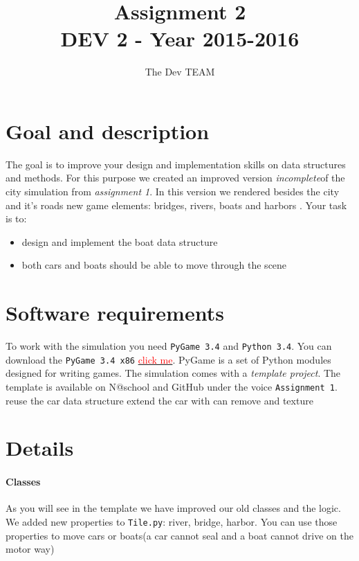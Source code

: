 \documentclass[10pt,a4paper]{article}
\begin{document}
\title{Assignment 2\\DEV 2 - Year 2015-2016}
\author{The Dev TEAM}
\maketitle


\section{Goal and description}
The goal is to improve your design and implementation skills on data structures and methods. For this purpose we created an improved version \textit{incomplete}of the city simulation from \textit{assignment 1}. In this version we rendered besides the city and it's roads new game elements: bridges, rivers, boats and harbors . Your task is to:
\begin{itemize}
\item design and implement the boat data structure  
\item both cars and boats should be able to move through the scene
\end{itemize}
	
	
\section{Software requirements}
To work with the simulation you need \texttt{PyGame 3.4} and \texttt{Python 3.4}. You can download the \texttt{PyGame 3.4 x86} \href{https://bitbucket.org/pygame/pygame/downloads/pygame-1.9.2a0-hg_ea3b3bb8714a.win32-py3.4.msi}{\textcolor{red}{click me}}. PyGame is a set of Python modules designed for writing games.	The simulation comes with a \textit{template project}. The template is available on N@school and GitHub under the voice \texttt{Assignment 1}.
reuse the car data structure 
extend the car with can remove and texture
\section{Details}

\paragraph{Classes}
As you will see in the template we have improved our old classes and the logic. We added new properties to \texttt{Tile.py}: river, bridge, harbor. You can use those properties to move cars or boats(a car cannot seal and a boat cannot drive on the motor way)
\end{document}
